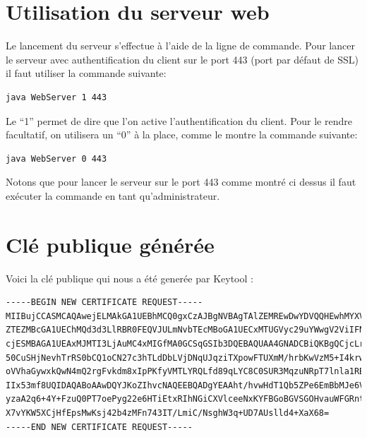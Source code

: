 \documentclass[10pt,a4paper,titlepage]{article}
\begin{document}
\section{Utilisation du serveur web}

Le lancement du serveur s'effectue à l'aide de la ligne de commande. Pour lancer le serveur avec authentification du client sur le port 443 (port par défaut de SSL) il faut utiliser la commande suivante:

\lstset{frameround=fttt}
\begin{lstlisting}[frame=trBL]
	java WebServer 1 443
\end{lstlisting}

Le “1” permet de dire que l'on active l'authentification du client. Pour le rendre facultatif, on utilisera un “0” à la place, comme le montre la commande suivante:

\begin{lstlisting}[frame=trBL]
	java WebServer 0 443
\end{lstlisting}

Notons que pour lancer le serveur sur le port 443 comme montré ci dessus il faut exécuter la commande en tant qu'administrateur. 





\section{Clé publique générée}

Voici la clé publique qui nous a été generée par Keytool :

{\scriptsize
\begin{verbatim}
-----BEGIN NEW CERTIFICATE REQUEST-----
MIIBujCCASMCAQAwejELMAkGA1UEBhMCQ0gxCzAJBgNVBAgTAlZEMREwDwYDVQQHEwhMYXVzYW5u
ZTEZMBcGA1UEChMQd3d3LlRBR0FEQVJULmNvbTEcMBoGA1UECxMTUGVyc29uYWwgV2ViIFNlcnZl
cjESMBAGA1UEAxMJMTI3LjAuMC4xMIGfMA0GCSqGSIb3DQEBAQUAA4GNADCBiQKBgQCjcLrCVl/h
50CuSHjNevhTrRS0bCQ1oCN27c3hTLdDbLVjDNqUJqziTXpowFTUXmM/hrbKwVzM5+I4krwx/6dW
oVVhaGywxkQwN4mQ2rgFvkdm8xIpPKfyVMTLYRQLfd89qLYC8C0SUR3MqzuNRpT7lnla1RB9A6Mg
IIx53mf8UQIDAQABoAAwDQYJKoZIhvcNAQEEBQADgYEAAht/hvwHdT1Qb5ZPe6EmBbMJe6VozqQT
yzaA2q6+4Y+FzuQ0PT7oePyg22e6HTiEtxRIhNGiCXVlceeNxKYFBGoBGVSGOHvauWFGRntErntQ
X7vYKW5XCjHfEpsMwKsj42b4zMFn743IT/LmiC/NsghW3q+UD7AUslld4+XaX68=
-----END NEW CERTIFICATE REQUEST-----
\end{verbatim}
}
\end{document}
